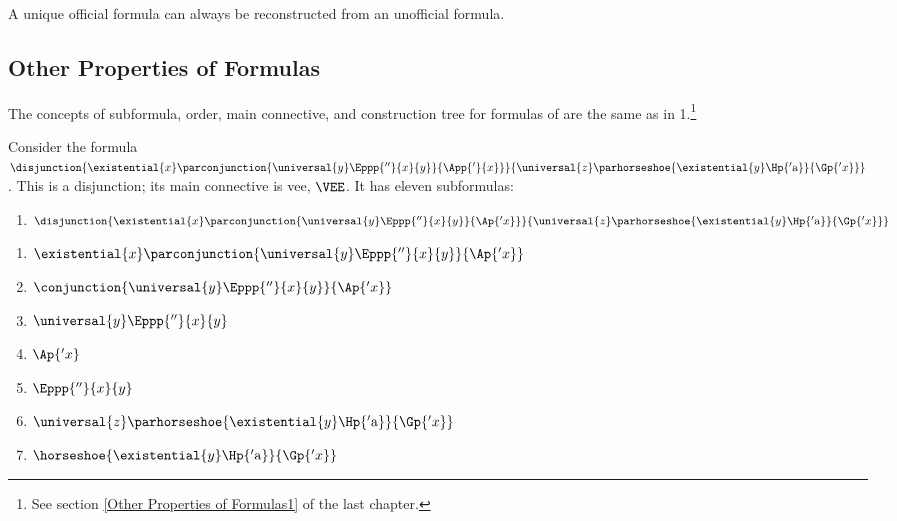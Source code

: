 A unique official formula can always be reconstructed from an unofficial formula.

\subsection{Other Properties of Formulas}\label{Other Properties of Formulas} 
The concepts of subformula, order, main connective, and construction tree for formulas of \GQL{} are the same as in \GQL{}1.\footnote{See section \ref{Other Properties of Formulas1} of the last chapter.} 
\begin{majorILnc}{}
Consider the formula $\disjunction{\existential{\variable{x}}\parconjunction{\universal{y}\Eppp{''}{\variable{x}}{\variable{y}}}{\App{'}{\variable{x}}}}{\universal{\variable{z}}\parhorseshoe{\existential{\variable{y}}\Hp{'\constant{a}}}{\Gp{'\variable{x}}}}$.
This is a disjunction; its main connective is vee, $\VEE$.
It has eleven subformulas:
\begin{enumerate}[label=(\arabic*), leftmargin=1.85\parindent,
labelindent=.35\parindent, labelsep=*, itemsep=0pt]%
\item $\disjunction{\existential{\variable{x}}\parconjunction{\universal{y}\Eppp{''}{\variable{x}}{\variable{y}}}{\Ap{'\variable{x}}}}{\universal{\variable{z}}\parhorseshoe{\existential{\variable{y}}\Hp{'\constant{a}}}{\Gp{'\variable{x}}}}$
\end{enumerate}
\vspace*{-.5cm}
\begin{multicols}{2}
\begin{enumerate}[label=(\arabic*), leftmargin=1.85\parindent,
labelindent=.35\parindent, labelsep=*, itemsep=0pt, start=2]%
\item $\existential{\variable{x}}\parconjunction{\universal{y}\Eppp{''}{\variable{x}}{\variable{y}}}{\Ap{'\variable{x}}}$
\item $\conjunction{\universal{y}\Eppp{''}{\variable{x}}{\variable{y}}}{\Ap{'\variable{x}}}$
\item $\universal{y}\Eppp{''}{\variable{x}}{\variable{y}}$
\item $\Ap{'\variable{x}}$
\item $\Eppp{''}{\variable{x}}{\variable{y}}$
\item $\universal{\variable{z}}\parhorseshoe{\existential{\variable{y}}\Hp{'\constant{a}}}{\Gp{'\variable{x}}}$
\item $\horseshoe{\existential{\variable{y}}\Hp{'\constant{a}}}{\Gp{'\variable{x}}}$

\end{enumerate}
\end{multicols}
\end{majorILnc}
